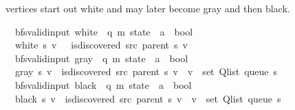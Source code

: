 \begin{isabellebody}
\begin{isamarkuptext}
vertices start out white and may later become gray and then black.%
\end{isamarkuptext}\isamarkuptrue%
\isamarkupfalse%
\ {\isacharparenleft}{\kern0pt}\ bfs{\isacharunderscore}{\kern0pt}valid{\isacharunderscore}{\kern0pt}input{\isacharparenright}{\kern0pt}\ white\ {\isacharcolon}{\kern0pt}{\isacharcolon}{\kern0pt}\ {\isachardoublequoteopen}{\isacharparenleft}{\kern0pt}{\isacharprime}{\kern0pt}q{\isacharcomma}{\kern0pt}\ {\isacharprime}{\kern0pt}m{\isacharparenright}{\kern0pt}\ state\ {\isasymRightarrow}\ {\isacharprime}{\kern0pt}a\ {\isasymRightarrow}\ bool{\isachardoublequoteclose}\ \isanewline
\ \ {\isachardoublequoteopen}white\ s\ v\ {\isasymequiv}\ {\isasymnot}\ is{\isacharunderscore}{\kern0pt}discovered\ src\ {\isacharparenleft}{\kern0pt}parent\ s{\isacharparenright}{\kern0pt}\ v{\isachardoublequoteclose}\isanewline
\isanewline
{}\isamarkupfalse%
\ {\isacharparenleft}{\kern0pt}\ bfs{\isacharunderscore}{\kern0pt}valid{\isacharunderscore}{\kern0pt}input{\isacharparenright}{\kern0pt}\ gray\ {\isacharcolon}{\kern0pt}{\isacharcolon}{\kern0pt}\ {\isachardoublequoteopen}{\isacharparenleft}{\kern0pt}{\isacharprime}{\kern0pt}q{\isacharcomma}{\kern0pt}\ {\isacharprime}{\kern0pt}m{\isacharparenright}{\kern0pt}\ state\ {\isasymRightarrow}\ {\isacharprime}{\kern0pt}a\ {\isasymRightarrow}\ bool{\isachardoublequoteclose}\ \isanewline
\ \ {\isachardoublequoteopen}gray\ s\ v\ {\isasymequiv}\ is{\isacharunderscore}{\kern0pt}discovered\ src\ {\isacharparenleft}{\kern0pt}parent\ s{\isacharparenright}{\kern0pt}\ v\ {\isasymand}\ v\ {\isasymin}\ set\ {\isacharparenleft}{\kern0pt}Q{\isacharunderscore}{\kern0pt}list\ {\isacharparenleft}{\kern0pt}queue\ s{\isacharparenright}{\kern0pt}{\isacharparenright}{\kern0pt}{\isachardoublequoteclose}\isanewline
\isanewline
{}\isamarkupfalse%
\ {\isacharparenleft}{\kern0pt}\ bfs{\isacharunderscore}{\kern0pt}valid{\isacharunderscore}{\kern0pt}input{\isacharparenright}{\kern0pt}\ black\ {\isacharcolon}{\kern0pt}{\isacharcolon}{\kern0pt}\ {\isachardoublequoteopen}{\isacharparenleft}{\kern0pt}{\isacharprime}{\kern0pt}q{\isacharcomma}{\kern0pt}\ {\isacharprime}{\kern0pt}m{\isacharparenright}{\kern0pt}\ state\ {\isasymRightarrow}\ {\isacharprime}{\kern0pt}a\ {\isasymRightarrow}\ bool{\isachardoublequoteclose}\ \isanewline
\ \ {\isachardoublequoteopen}black\ s\ v\ {\isasymequiv}\ is{\isacharunderscore}{\kern0pt}discovered\ src\ {\isacharparenleft}{\kern0pt}parent\ s{\isacharparenright}{\kern0pt}\ v\ {\isasymand}\ v\ {\isasymnotin}\ set\ {\isacharparenleft}{\kern0pt}Q{\isacharunderscore}{\kern0pt}list\ {\isacharparenleft}{\kern0pt}queue\ s{\isacharparenright}{\kern0pt}{\isacharparenright}{\kern0pt}{\isachardoublequoteclose}\isanewline

\end{isabellebody}
